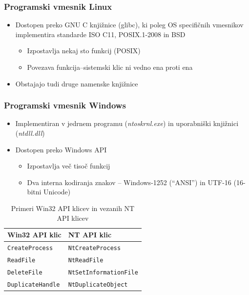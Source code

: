 \documentclass{beamer}
\begin{document}
\begin{frame}
	\frametitle{Programski vmesnik Linux}
	\begin{itemize}
		\item Dostopen preko GNU C knjižnice (glibc), ki poleg OS specifičnih vmesnikov implementira standarde ISO C11, POSIX.1-2008 in BSD
		      \begin{itemize}
		      	\item Izpostavlja nekaj sto funkcij (POSIX)
		      	\item Povezava funkcija--sistemski klic ni vedno ena proti ena
		      \end{itemize}
		\item Obstajajo tudi druge namenske knjižnice
	\end{itemize}
\end{frame}

\begin{frame}
	\frametitle{Programski vmesnik Windows}
	\begin{itemize}
		\item Implementiran v jedrnem programu (\textit{ntoskrnl.exe}) in uporabniški knjižnici (\textit{ntdll.dll})
		\item Dostopen preko Windows API
		      \begin{itemize}
		      	\item Izpostavlja več tisoč funkcij
		      	\item Dva interna kodiranja znakov -- Windows-1252 (``ANSI'') in UTF-16 (16-bitni Unicode)
		      \end{itemize}
	\end{itemize}
	\begin{table}
		\begin{center}
			\begin{tabular}{ l|l }
				Win32 API klic           & NT API klic                   \\
				\hline
				\texttt{CreateProcess}   & \texttt{NtCreateProcess}      \\
				\texttt{ReadFile}        & \texttt{NtReadFile}           \\
				\texttt{DeleteFile}      & \texttt{NtSetInformationFile} \\
				\texttt{DuplicateHandle} & \texttt{NtDuplicateObject}    \\
			\end{tabular}
		\end{center}
		\caption{Primeri Win32 API klicev in vezanih NT API klicev}
	\end{table}
\end{frame}
\end{document}
